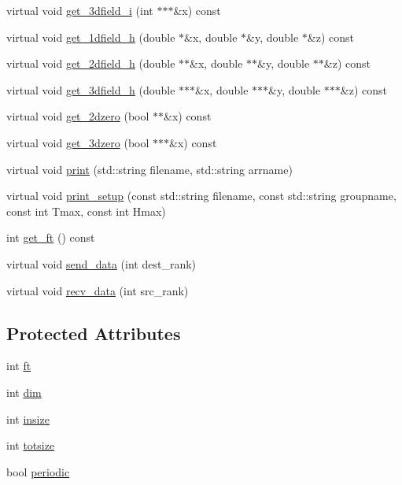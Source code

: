 \begin{DoxyCompactItemize}
\item 
virtual void \hyperlink{classfield__type_ac005ee44a3ffc5feabda864e181f8c28}{get\+\_\+3dfield\+\_\+i} (int $\ast$$\ast$$\ast$\&x) const 
\item 
virtual void \hyperlink{classfield__type_aa3c7c5992e51d5588601e1a8681c6ae1}{get\+\_\+1dfield\+\_\+h} (double $\ast$\&x, double $\ast$\&y, double $\ast$\&z) const 
\item 
virtual void \hyperlink{classfield__type_af15dfa4de69c756148f82628b095b22e}{get\+\_\+2dfield\+\_\+h} (double $\ast$$\ast$\&x, double $\ast$$\ast$\&y, double $\ast$$\ast$\&z) const 
\item 
virtual void \hyperlink{classfield__type_ae8649f8841a9c363914d4f72cea4df5f}{get\+\_\+3dfield\+\_\+h} (double $\ast$$\ast$$\ast$\&x, double $\ast$$\ast$$\ast$\&y, double $\ast$$\ast$$\ast$\&z) const 
\item 
virtual void \hyperlink{classfield__type_a4924396b413bb7f5a43e6602561bdfbf}{get\+\_\+2dzero} (bool $\ast$$\ast$\&x) const 
\item 
virtual void \hyperlink{classfield__type_aa6fa2f915583fc2941db7713138d8f8b}{get\+\_\+3dzero} (bool $\ast$$\ast$$\ast$\&x) const 
\item 
virtual void \hyperlink{classfield__type_a70fd2b76f1a1bf1604bcdb39d99687d2}{print} (std\+::string filename, std\+::string arrname)
\item 
virtual void \hyperlink{classfield__type_a1429809586fadd4afa829bef77fa819d}{print\+\_\+setup} (const std\+::string filename, const std\+::string groupname, const int Tmax, const int Hmax)
\item 
int \hyperlink{classfield__type_a66e2771b5ddf65d5f7c4e5bcb3186d2f}{get\+\_\+ft} () const 
\item 
virtual void \hyperlink{classfield__type_afaabc410e2ce254c23e3c4aa39d1916d}{send\+\_\+data} (int dest\+\_\+rank)
\item 
virtual void \hyperlink{classfield__type_ac29bf02760384b80a08e5e57ca43542f}{recv\+\_\+data} (int src\+\_\+rank)
\end{DoxyCompactItemize}
\subsection*{Protected Attributes}
\begin{DoxyCompactItemize}
\item 
int \hyperlink{classfield__type_a6122e0fff3bcc40a158369cd3fd19c88}{ft}
\item 
int \hyperlink{classfield__type_a58b576356c02b88ea686aa9937e527f6}{dim}
\item 
int \hyperlink{classfield__type_adcbc745f653a086ececd263baddde7f1}{insize}
\item 
int \hyperlink{classfield__type_ad74b0d86e6384925090cdf090f1e90f5}{totsize}
\item 
bool \hyperlink{classfield__type_a44d8b06e823939f2dda6706cb38a3280}{periodic}
\end{DoxyCompactItemize}


